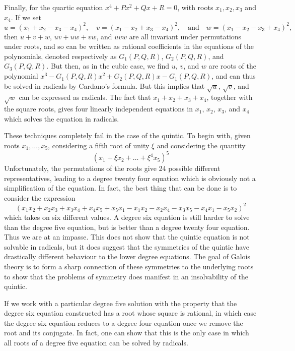 Finally, for the quartic equation $x^4 + Px^2 + Qx + R = 0$, with roots $x_1,x_2,x_3$ and $x_4$. If we set
%
\[ u = (x_1 + x_2 - x_3 - x_4)^2,\quad v = (x_1 - x_2 + x_3 - x_4)^2,\quad\text{and}\quad w = (x_1 - x_2 - x_3 + x_4)^2, \]
%
then $u + v + w$, $uv + uw + vw$, and $uvw$ are all invariant under permutations under roots, and so can be written as rational coefficients in the equations of the polynomials, denoted respectively as $G_1(P,Q,R)$, $G_2(P,Q,R)$, and $G_3(P,Q,R)$. But then, as in the cubic case, we find $u$, $v$, and $w$ are roots of the polynomial $x^3 - G_1(P,Q,R) x^2 + G_2(P,Q,R) x - G_1(P,Q,R)$, and can thus be solved in radicals by Cardano's formula. But this implies that $\sqrt{u}$, $\sqrt{v}$, and $\sqrt{w}$ can be expressed as radicals. The fact that $x_1 + x_2 + x_3 + x_4$, together with the square roots, gives four linearly independent equations in $x_1$, $x_2$, $x_3$, and $x_4$ which solves the equation in radicals.

These techniques completely fail in the case of the quintic. To begin with, given roots $x_1, \dots, x_5$, considering a fifth root of unity $\xi$ and considering the quantity
%
\[ (x_1 + \xi x_2 + \dots + \xi^4 x_5)^5 \]
%
Unfortunately, the permutations of the roots give 24 possible different representatives, leading to a degree twenty four equation which is obviously not a simplification of the equation. In fact, the best thing that can be done is to consider the expression
%
\[ (x_1x_2 + x_2x_3 + x_3x_4 + x_4x_5 + x_5x_1 - x_1x_2 - x_2x_4 - x_3x_5 - x_4x_1 - x_5x_2)^2 \]
%
which takes on six different values. A degree six equation is still harder to solve than the degree five equation, but is better than a degree twenty four equation. Thus we are at an impasse. This does not show that the quintic equation is not solvable in radicals, but it does suggest that the symmetries of the quintic have drastically different behaviour to the lower degree equations. The goal of Galois theory is to form a sharp connection of these symmetries to the underlying roots to show that the problems of symmetry does manifest in an insolvability of the quintic.

\begin{remark}
	If we work with a particular degree five solution with the property that the degree six equation constructed has a root whose square is rational, in which case the degree six equation reduces to a degree four equation once we remove the root and its conjugate. In fact, one can show that this is the only case in which all roots of a degree five equation can be solved by radicals.
\end{remark}

